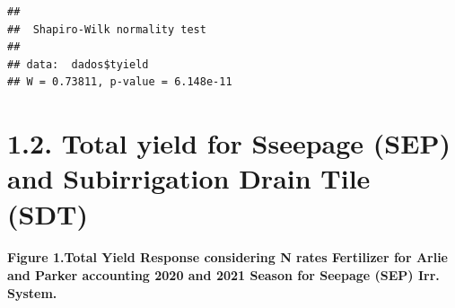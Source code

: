 \documentclass[
]{article}
\begin{document}
\begin{verbatim}
## 
##  Shapiro-Wilk normality test
## 
## data:  dados$tyield
## W = 0.73811, p-value = 6.148e-11
\end{verbatim}

\hypertarget{total-yield-for-sseepage-sep-and-subirrigation-drain-tile-sdt}{%
\section{1.2. Total yield for Sseepage (SEP) and Subirrigation Drain
Tile
(SDT)}\label{total-yield-for-sseepage-sep-and-subirrigation-drain-tile-sdt}}

\hypertarget{figure-1.total-yield-response-considering-n-rates-fertilizer-for-arlie-and-parker-accounting-2020-and-2021-season-for-seepage-sep-irr.-system.}{%
\paragraph{\texorpdfstring{\textbf{Figure 1.}Total Yield Response
considering N rates Fertilizer for Arlie and Parker accounting 2020 and
2021 Season for Seepage (SEP) Irr.
System.}{Figure 1.Total Yield Response considering N rates Fertilizer for Arlie and Parker accounting 2020 and 2021 Season for Seepage (SEP) Irr. System.}}\label{figure-1.total-yield-response-considering-n-rates-fertilizer-for-arlie-and-parker-accounting-2020-and-2021-season-for-seepage-sep-irr.-system.}}
\end{document}
